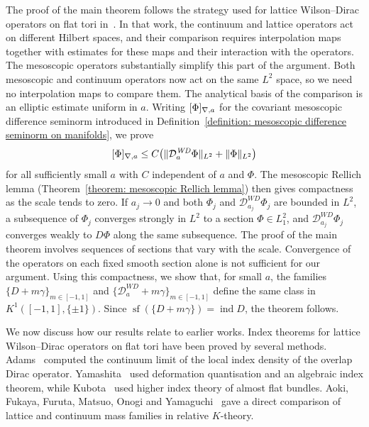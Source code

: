 \documentclass[a4paper,oneside,12pt]{amsart}
\theoremstyle{plain}
\theoremstyle{definition}
\theoremstyle{remark}
\DeclarePairedDelimiter{\norm}{\lVert}{\rVert}
\DeclarePairedDelimiter{\seminorm}{\lbrack}{\rbrack}
\DeclareMathOperator{\indexAtiyahSinger}{ind}
\DeclareMathOperator{\spectralflow}{sf}
\newcommand{\Ltwonorm}[2][L^2]{\norm{#2}_{#1}}
\newcommand{\mesoscopicdifferenceseminorm}[2][a]{\seminorm{#2}_{\nabla,#1}}
\newcommand{\mesoscopicWilsonDiracoperator}[1][a]{\mathcal{D}_{#1}^{\mathit{WD}}}
\begin{document}
The proof of the main theorem follows the strategy used for lattice Wilson--Dirac operators on flat tori in~\cite{MR5076866}.
In that work, the continuum and lattice operators act on different Hilbert spaces, and their comparison requires interpolation maps together with estimates for these maps and their interaction with the operators.
The mesoscopic operators substantially simplify this part of the argument.
Both mesoscopic and continuum operators now act on the same $L^2$ space, so we need no interpolation maps to compare them.
The analytical basis of the comparison is an elliptic estimate uniform in $a$.
Writing $\mesoscopicdifferenceseminorm{\Phi}$ for the covariant mesoscopic difference seminorm introduced in Definition~\ref{definition: mesoscopic difference seminorm on manifolds}, we prove
\begin{equation}
  \mesoscopicdifferenceseminorm{\Phi} \le C \bigl(\Ltwonorm{\mesoscopicWilsonDiracoperator \Phi} + \Ltwonorm{\Phi}\bigr)
\end{equation}
for all sufficiently small $a$ with $C$ independent of $a$ and $\Phi$.
The mesoscopic Rellich lemma (Theorem~\ref{theorem: mesoscopic Rellich lemma}) then gives compactness as the scale tends to zero.
If $a_j \to 0$ and both $\Phi_j$ and $\mesoscopicWilsonDiracoperator[a_j]\Phi_j$ are bounded in $L^2$, a subsequence of $\Phi_j$ converges strongly in $L^2$ to a section $\Phi \in L^2_1$, and $\mesoscopicWilsonDiracoperator[a_j] \Phi_j$ converges weakly to $D \Phi$ along the same subsequence.
The proof of the main theorem involves sequences of sections that vary with the scale.
Convergence of the operators on each fixed smooth section alone is not sufficient for our argument.
Using this compactness, we show that, for small $a$, the families $\{D+m\gamma\}_{m \in [-1,1]}$ and $\{\mesoscopicWilsonDiracoperator+m\gamma\}_{m \in [-1,1]}$ define the same class in $K^1([-1,1],\{\pm 1\})$.
Since $\spectralflow (\{D+m\gamma\}) = \indexAtiyahSinger D$, the theorem follows.


We now discuss how our results relate to earlier works.
Index theorems for lattice Wilson--Dirac operators on flat tori have been proved by several methods.
Adams~\cite{MR1866670} computed the continuum limit of the local index density of the overlap Dirac operator.
Yamashita~\cite{MR4275791} used deformation quantisation and an algebraic index theorem, while Kubota~\cite{MR4407739} used higher index theory of almost flat bundles.
Aoki, Fukaya, Furuta, Matsuo, Onogi and Yamaguchi~\cite{MR5076866} gave a direct comparison of lattice and continuum mass families in relative $K$-theory.
\end{document}
